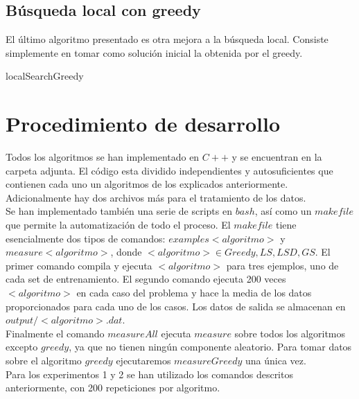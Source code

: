 \documentclass[11pt,a4paper]{article}
\begin{document}
	\subsection{Búsqueda local con greedy}
	
	El último algoritmo presentado es otra mejora a la búsqueda local. Consiste simplemente en tomar como solución inicial la obtenida por el greedy. 
	
	\begin{algorithm}
	\caption{localSearchGreedy}
	\end{algorithm}


	\section{Procedimiento de desarrollo}
	
	Todos los algoritmos se han implementado en $C++$ y se encuentran en la carpeta adjunta. El código esta dividido independientes y autosuficientes que contienen cada uno un algoritmos de los explicados anteriormente. Adicionalmente hay dos archivos más para el tratamiento de los datos. \\
	
	Se han implementado también una serie de scripts en $bash$, así como un $makefile$ que permite la automatización de todo el proceso. El $makefile$ tiene esencialmente dos tipos de comandos: $examples<algoritmo>$ y $measure<algoritmo>$, donde $<algoritmo> \in {Greedy, LS, LSD, GS}$. El primer comando compila y ejecuta $<algoritmo>$ para tres ejemplos, uno de cada set de entrenamiento. El segundo comando ejecuta 200 veces $<algoritmo>$ en cada caso del problema y hace la media de los datos proporcionados para cada uno de los casos. Los datos de salida se almacenan en $output/<algoritmo>.dat$. \\
	
	Finalmente el comando $measureAll$ ejecuta $measure$ sobre todos los algoritmos excepto $greedy$, ya que no tienen ningún componente aleatorio. Para tomar datos sobre el algoritmo $greedy$ ejecutaremos $measureGreedy$ una única vez. \\
	
	Para los experimentos 1 y 2 se han utilizado los comandos descritos anteriormente, con 200 repeticiones por algoritmo. \\
	
\end{document}
